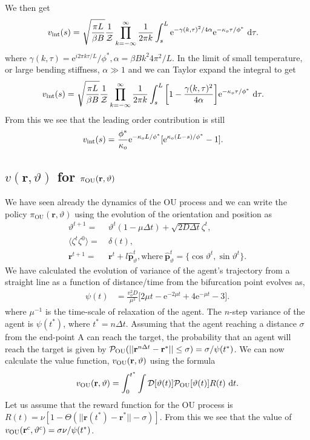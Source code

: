 \documentclass[%
reprint,
superscriptaddress,
floatfix,
amsmath,
amssymb,
aps,
notitlepage
]{revtex4-1}
\def\d{\text{d}}
\def\e{\text{e}}
\def\r{\mathbf{r}}
\def\ph{\hat{\mathbf{p}}}
\def\P{\mathcal{P}}
\def\D{\mathcal{D}}
\def\Z{\mathcal{Z}}
\def\theta{\vartheta}
\begin{document}
We then get
\begin{align}
    v_{\rm int}(s) =& \ \sqrt{\frac{\pi L}{\beta B}}  \frac{1}{\Z} \prod_{k=-\infty}^\infty \frac{1}{2\pi k}  \int_{s}^L \e^{-\gamma(k, \tau)^2/4\alpha} \e^{-\kappa_o \tau/\phi^*} \ \d \tau.
\end{align}
where $\gamma(k, \tau) = \e^{i 2 \pi k \tau/L}/\phi^*, \alpha = \beta B k^2 4 \pi^2/L$. In the limit of small temperature,
or large bending stiffness, $\alpha \gg 1$ and we can Taylor expand the integral to get
\begin{align}
    v_{\rm int}(s) =& \ \sqrt{\frac{\pi L}{\beta B}}  \frac{1}{\Z} \prod_{k=-\infty}^\infty \frac{1}{2\pi k}  \int_{s}^L \bigg[ 1 - \frac{\gamma(k, \tau)^2}{4\alpha} \bigg] \e^{-\kappa_o \tau/\phi^*} \ \d \tau.
\end{align}
From this we see that the leading order contribution is still
\begin{align}
    v_{\rm int}(s) =& \ \frac{\phi^*}{\kappa_o} \e^{-\kappa_o L/\phi^*} [ \e^{\kappa_o(L-s)/\phi^*} - 1].
\end{align}

\subsection{$v(\r, \theta)$ for $\pi_{\rm OU}(\r, \theta)$}
We have seen already the dynamics of the OU process and we can write the policy $\pi_\text{OU}(\r, \theta)$ using the evolution
of the orientation and position as
\begin{align}
    \theta^{t+1} =& \ \theta^t (1 - \mu \Delta t ) + \sqrt{2 D \Delta t} \zeta^t, \\
    \langle \zeta^t \zeta^0 \rangle =& \ \delta(t), \\
    \r^{t+1} =& \ \r^{t} + l \ph_\theta^t, \text{where} \ \ph_\theta^t = \{ \cos \theta^t, \sin \theta^t \}.
\end{align}
We have calculated the evolution of variance of the agent's trajectory from a straight line as a function of
distance/time from the bifurcation point evolves as,
\begin{align}
    \psi(t) & = \frac{v_o^2 D}{\mu^3} \bigg[ 2 \mu t - \e^{-2 \mu t} + 4 \e^{-\mu t} - 3 \bigg].
\end{align}
where $\mu^{-1}$ is the time-scale of relaxation of the agent. The $n$-step variance of the agent is
$\psi (t^*)$, where $t^* = n \Delta t$. Assuming that the agent reaching a distance $\sigma$ from the end-point A can reach the
target, the probability that an agent will reach the target is given by $\P_{\rm OU}(||\r^{n\Delta t} - \r^*|| \leq \sigma)
= \sigma/\psi(t^*)$. We can now calculate the value function, $v_{\rm OU}(\r, \theta)$ using the formula
\[
    v_{\rm OU}(\r, \theta) = \int_{0}^{t^*} \int \D[\theta(t)] \P_{\rm OU}[\theta(t)] R(t) \ \d t.
\]
Let us assume that the reward function for the OU process is $R(t) = \nu[1 - \Theta(||\r(t^*) - \r^*|| - \sigma)]$.
From this we see that the value of $v_{\rm OU}(\r^c, \theta^c) = \sigma \nu/\psi(t^*)$.
\end{document}
